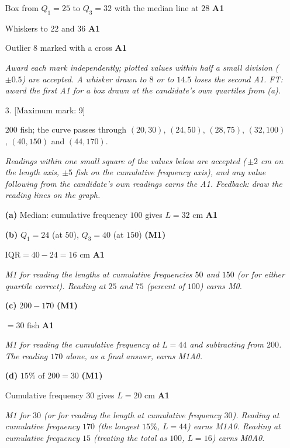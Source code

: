 \documentclass[12pt, twoside]{article}
\begin{document}
\begin{enumerate}[itemsep=0.3cm]
Box from $Q_{1} = 25$ to $Q_{3} = 32$ with the median line at $28$
\hfill \textbf{A1}

Whiskers to $22$ and $36$ \hfill \textbf{A1}

Outlier $8$ marked with a cross \hfill \textbf{A1}

\emph{Award each mark independently; plotted values within half a small
division ($\pm 0.5$) are accepted. A whisker drawn to $8$ or to $14.5$ loses
the second A1. FT: award the first A1 for a box drawn at the candidate's own
quartiles from (a).}

\newpage

\item[3.] [Maximum mark: 9]

$200$ fish; the curve passes through $(20, 30)$, $(24, 50)$, $(28, 75)$,
$(32, 100)$, $(40, 150)$ and $(44, 170)$.

\emph{Readings within one small square of the values below are accepted
(\,$\pm 2$ cm on the length axis, $\pm 5$ fish on the cumulative frequency
axis), and any value following from the candidate's own readings earns the
A1. Feedback: draw the reading lines on the graph.}

\textbf{(a)} Median: cumulative frequency $100$ gives $L = 32$ cm
\hfill \textbf{A1}

\textbf{(b)} $Q_{1} = 24$ (at $50$), \quad $Q_{3} = 40$ (at $150$)
\hfill \textbf{(M1)}

$\text{IQR} = 40 - 24 = 16$ cm \hfill \textbf{A1}

\emph{M1 for reading the lengths at cumulative frequencies $50$ and $150$
(or for either quartile correct). Reading at $25$ and $75$ (percent of
$100$) earns M0.}

\textbf{(c)} $200 - 170$ \hfill \textbf{(M1)}

$= 30$ fish \hfill \textbf{A1}

\emph{M1 for reading the cumulative frequency at $L = 44$ and subtracting
from $200$. The reading $170$ alone, as a final answer, earns M1A0.}

\textbf{(d)} $15\% \text{ of } 200 = 30$ \hfill \textbf{(M1)}

Cumulative frequency $30$ gives $L = 20$ cm \hfill \textbf{A1}

\emph{M1 for $30$ (or for reading the length at cumulative frequency $30$).
Reading at cumulative frequency $170$ (the longest $15\%$, $L = 44$) earns
M1A0. Reading at cumulative frequency $15$ (treating the total as $100$,
$L = 16$) earns M0A0.}


\end{enumerate}
\end{document}
